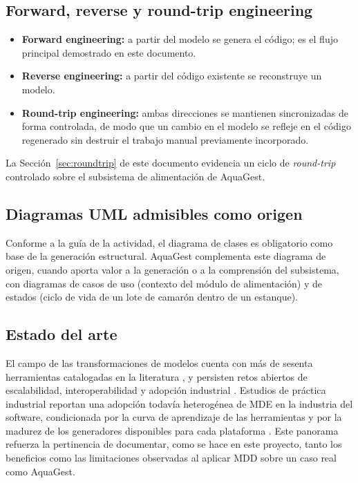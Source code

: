 \documentclass[11pt,a4paper]{article}
\begin{document}
\subsection{Forward, reverse y round-trip engineering}
\begin{itemize}[nosep]
  \item \textbf{Forward engineering:} a partir del modelo se genera el código; es el flujo principal
        demostrado en este documento.
  \item \textbf{Reverse engineering:} a partir del código existente se reconstruye un modelo.
  \item \textbf{Round-trip engineering:} ambas direcciones se mantienen sincronizadas de forma
        controlada, de modo que un cambio en el modelo se refleje en el código regenerado sin
        destruir el trabajo manual previamente incorporado.
\end{itemize}
La Sección~\ref{sec:roundtrip} de este documento evidencia un ciclo de \textit{round-trip} controlado
sobre el subsistema de alimentación de AquaGest.

\subsection{Diagramas UML admisibles como origen}
Conforme a la guía de la actividad, el diagrama de clases es obligatorio como base de la generación
estructural. AquaGest complementa este diagrama de origen, cuando aporta valor a la generación o a
la comprensión del subsistema, con diagramas de casos de uso (contexto del módulo de alimentación)
y de estados (ciclo de vida de un lote de camarón dentro de un estanque).

\subsection{Estado del arte}
El campo de las transformaciones de modelos cuenta con más de sesenta herramientas catalogadas en
la literatura \cite{kahani2019}, y persisten retos abiertos de escalabilidad, interoperabilidad y adopción
industrial \cite{bucchiarone2020}. Estudios de práctica industrial reportan una adopción todavía
heterogénea de MDE en la industria del software, condicionada por la curva de aprendizaje de las
herramientas y por la madurez de los generadores disponibles para cada plataforma
\cite{whittle2014}. Este panorama refuerza la pertinencia de documentar, como se hace en este
proyecto, tanto los beneficios como las limitaciones observadas al aplicar MDD sobre un caso real
como AquaGest.
\end{document}
